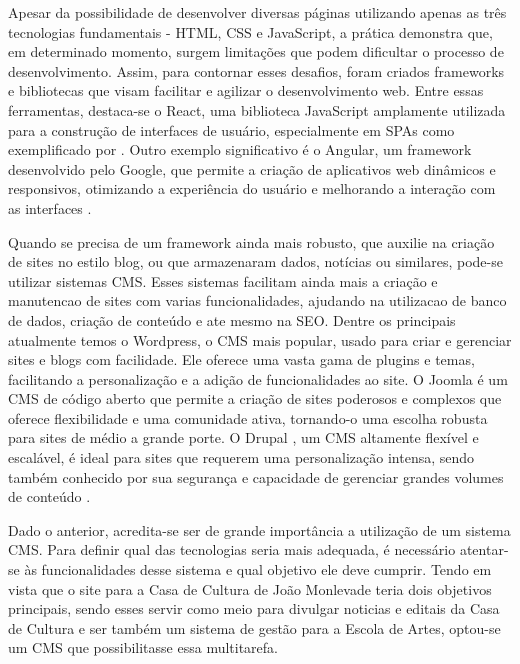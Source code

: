 Apesar da possibilidade de desenvolver diversas páginas utilizando apenas as três tecnologias fundamentais - \ac{HTML}, \ac{CSS} e JavaScript, a prática demonstra que, em determinado momento, surgem limitações que podem dificultar o processo de desenvolvimento. Assim, para contornar esses desafios, foram criados frameworks e bibliotecas que visam facilitar e agilizar o desenvolvimento web. Entre essas ferramentas, destaca-se o React, uma biblioteca JavaScript amplamente utilizada para a construção de interfaces de usuário, especialmente em \ac{SPAs} como exemplificado por . Outro exemplo significativo é o Angular, um framework desenvolvido pelo Google, que permite a criação de aplicativos web dinâmicos e responsivos, otimizando a experiência do usuário e melhorando a interação com as interfaces \cite{green2013angularjs}.

Quando se precisa de um framework ainda mais robusto, que auxilie na criação de sites no estilo blog, ou que armazenaram dados, notícias ou similares, pode-se utilizar sistemas \ac{CMS}. Esses sistemas facilitam ainda mais a criação e manutencao de sites com varias funcionalidades, ajudando na utilizacao de banco de dados, criação de conteúdo e ate mesmo na \ac{SEO}. Dentre os principais atualmente temos o Wordpress, o \ac{CMS} mais popular, usado para criar e gerenciar sites e blogs com facilidade. Ele oferece uma vasta gama de plugins e temas, facilitando a personalização e a adição de funcionalidades ao site. O Joomla \cite{Joomla} é um \ac{CMS} de código aberto que permite a criação de sites poderosos e complexos que oferece flexibilidade e uma comunidade ativa, tornando-o uma escolha robusta para sites de médio a grande porte. O Drupal \cite{Drupal}, um \ac{CMS} altamente flexível e escalável, é ideal para sites que requerem uma personalização intensa, sendo também conhecido por sua segurança e capacidade de gerenciar grandes volumes de conteúdo \cite{canavan2011cms}.

Dado o anterior, acredita-se ser de grande importância a utilização de um sistema \ac{CMS}. Para definir qual das tecnologias seria mais adequada, é necessário atentar-se às funcionalidades desse sistema e qual objetivo ele deve cumprir. Tendo em vista que o site para a Casa de Cultura de João Monlevade teria dois objetivos principais, sendo esses servir como meio para divulgar noticias e editais da Casa de Cultura e ser também um sistema de gestão para a Escola de Artes, optou-se um \ac{CMS} que possibilitasse essa multitarefa.

